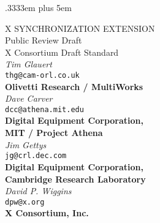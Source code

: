 
\newcommand{\cfunctionname}[1]{\mbox{\tt#1}}
\newcommand{\ctypename}[1]{\mbox{\tt#1}}
\newcommand{\cconst}[1]{\mbox{\tt#1}}
\newcommand{\cargname}[1]{\mbox{\it#1}}
\newcommand{\cstartfunction}[2]{\begin{sloppypar}\begin{samepage}\ctypename{#1}\\ \cfunctionname{#2}\ (}
\newcommand{\cargdecl}[2]{\penalty -1\ctypename{#1} \cargname{#2}}
\newcommand{\cendfunctiondecl}{){\hangafter=2 \hangindent=20pt \raggedright\par}}
\newcommand{\cendfuncdescription}{\end{samepage}\end{sloppypar}}

\newcommand{\cstartmacro}[2]{\begin{sloppypar}\begin{samepage}\ctypename{#1}\\ \cfunctionname{#2}\ (}
\newcommand{\cendmacrodecl}{)\par}
\newcommand{\cendmacrodescription}{\end{samepage}\end{sloppypar}}

\spaceskip .3333em plus 5em



\begin{center}

{\large X SYNCHRONIZATION EXTENSION}\\[10pt]
{\large Public Review Draft}\\[15pt]
{\large X Consortium Draft Standard}\\[15pt]
{\it Tim Glauert}\\[0pt]
{\tt thg@cam-orl.co.uk}\\[0pt]
{\bf Olivetti Research / MultiWorks}\\[5pt]
{\it Dave Carver}\\[0pt]
{\tt dcc@athena.mit.edu}\\[0pt]
{\bf Digital Equipment Corporation,}\\[0pt]
{\bf MIT / Project Athena}\\[5pt]
{\it Jim Gettys}\\[0pt]
{\tt jg@crl.dec.com}\\[0pt]
{\bf Digital Equipment Corporation,}\\[0pt]
{\bf Cambridge Research Laboratory}\\[5pt]
{\it David P. Wiggins}\\[0pt]
{\tt dpw@x.org}\\[0pt]
{\bf X Consortium, Inc.}\\[0pt]

\end {center}

